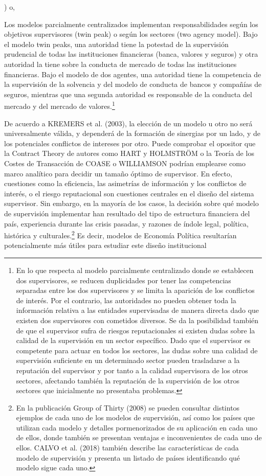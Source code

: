 \documentclass[10pt,a4paper]{article}
\newcounter{alphaitem}
\newenvironment{la}
      {\begin{list}{\alph{alphaitem})}{%
          \usecounter{alphaitem}%
          \setlength{\leftmargin}{1cm}%
          \setlength{\parskip}{3pt}%
          \setlength{\itemsep}{0pt}%
          \setlength{\parsep}{0pt}%
      }}
      {\end{list}}
\begin{document}
\begin{la}
{    } o,
    \item Los modelos parcialmente centralizados implementan responsabilidades según los objetivos supervisores (twin peak) o según los sectores (two agency model). Bajo el modelo twin peaks, una autoridad tiene la potestad de la supervisión prudencial de todas las instituciones financieras (banca, valores y seguros) y otra autoridad la tiene sobre la conducta de mercado de todas las instituciones financieras. Bajo el modelo de dos agentes, una autoridad tiene la competencia de la supervisión de la solvencia y del modelo de conducta de bancos y compañías de seguros, mientras que una segunda autoridad es responsable de la conducta del mercado y del mercado de valores.\footnote{%
        En lo que respecta al modelo parcialmente centralizado donde se establecen dos supervisores, se reducen duplicidades por tener las competencias separadas entre los dos supervisores y se limita la aparición de los conflictos de interés. Por el contrario, las autoridades no pueden obtener toda la información relativa a las entidades supervisadas de manera directa dado que existen dos supervisores con cometidos diversos. Se da la posibilidad también de que el supervisor sufra de riesgos reputacionales si existen dudas sobre la calidad de la supervisión en un sector específico. Dado que el supervisor es competente para actuar en todos los sectores, las dudas sobre una calidad de supervisión suficiente en un determinado sector pueden trasladarse a la reputación del supervisor y por tanto a la calidad supervisora de los otros sectores, afectando también la reputación de la supervisión de los otros sectores que inicialmente no presentaba problemas.
    }
\end{la}

De acuerdo a KREMERS et al. (2003), la elección de un modelo u otro no será universalmente válida, y dependerá de la formación de sinergias por un lado, y de los potenciales conflictos de intereses por otro. Puede comprobar el opositor que la Contract Theory de autores como HART y HOLMSTRÖM o la Teoría de los Costes de Transacción de COASE o WILLIAMSON podrían emplearse como marco analítico para decidir un tamaño óptimo de supervisor. En efecto, cuestiones como la eficiencia, las asimetrías de información y los conflictos de interés, o el riesgo reputacional son cuestiones centrales en el diseño del sistema supervisor. Sin embargo, en la mayoría de los casos, la decisión sobre qué modelo de supervisión implementar han resultado del tipo de estructura financiera del país, experiencia durante las crisis pasadas, y razones de índole legal, política, histórica y culturales.\footnote{%
    En la publicación Group of Thirty (2008) se pueden consultar distintos ejemplos de cada uno de los modelos de supervisión, así como los países que utilizan cada modelo y detalles pormenorizados de su aplicación en cada uno de ellos, donde también se presentan ventajas e inconvenientes de cada uno de ellos. CALVO et al. (2018) también describe las características de cada modelo de supervisión y presenta un listado de países identificando qué modelo sigue cada uno.
} Es decir, modelos de Economía Política resultarían potencialmente más útiles para estudiar este diseño institucional 
\end{document}
